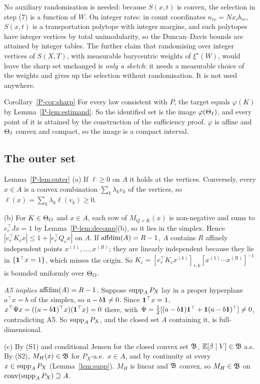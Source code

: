 No auxiliary randomisation is needed: because $S(x,t)$ is convex, the selection in
step (7) is a function of $W$. On integer rates: in count coordinates
$n_{rc}=Nx_rb_{rc}$, $S(x,t)$ is a transportation polytope with integer margins, and
such polytopes have integer vertices by total unimodularity, so the Duncan--Davis
bounds are attained by integer tables. The further claim that randomising over
integer vertices of $S(X,T)$, with measurable barycentric weights of $\xi^\star(W)$,
would leave the sharp set unchanged is \emph{only a sketch}: it needs a measurable
choice of the weights and gives up the selection without randomisation. It is not
used anywhere.

\begin{proofof}{Corollary~\ref{P-cor:sharp}}
For every law consistent with $P$, the target equals $\varphi(K)$ by
Lemma~\ref{P-lem:estimand}. So the identified set is the image $\varphi(\Theta_I)$, and
every point of it is attained by the construction of the sufficiency proof. $\varphi$
is affine and $\Theta_I$ convex and compact, so the image is a compact interval.
\end{proofof}

\subsection{The outer set}

\begin{proofof}{Lemma~\ref{P-lem:outer}}
(a) If $\ell\ge0$ on $A$ it holds at the vertices. Conversely, every $x\in A$ is a
convex combination $\sum_k\lambda_kv_k$ of the vertices, so $\ell(x)=\sum_k\lambda_k\ell(v_k)\ge0$.

(b) For $K\in\Theta_O$ and $x\in A$, each row of $M_{Q+K}(x)$ is non-negative and sums to
$e_r^\top Jx=1$ by Lemma~\ref{P-lem:decomp}(b), so it lies in the simplex. Hence
$|e_r^\top K_cx|\le1+|e_r^\top Q_cx|$ on $A$. If $\operatorname{affdim}(A)=R-1$, $A$ contains $R$
affinely independent points $x^{(1)},\dots,x^{(R)}$; they are linearly independent
because they lie in $\{\mathbf 1^\top x=1\}$, which misses the origin. So
$K_c=[e_r^\top K_cx^{(k)}]_{r,k}[x^{(1)}\cdots x^{(R)}]^{-1}$ is bounded uniformly over
$\Theta_O$.

\emph{A5 implies $\operatorname{affdim}(A)=R-1$.} Suppose $\operatorname{supp}_AP_X$ lay in a proper hyperplane
$a^\top x=b$ of the simplex, so $a-b\mathbf 1\ne0$. Since $\mathbf 1^\top x=1$,
$x^\top\Psi x=((a-b\mathbf 1)^\top x)(\mathbf 1^\top x)=0$ there, with
$\Psi=\tfrac12[(a-b\mathbf 1)\mathbf 1^\top+\mathbf 1(a-b\mathbf 1)^\top]\ne0$, contradicting A5. So
$\operatorname{supp}_AP_X$, and the closed set $A$ containing it, is full-dimensional.

(c) By (S1) and conditional Jensen for the closed convex set $\mathfrak B$,
$\mathbb E[\beta\mid V]\in\mathfrak B$ a.s. By (S2), $M_H(x)\in\mathfrak B$ for $P_X$-a.e.\ $x\in A$, and by
continuity at every $x\in\operatorname{supp}_AP_X$ (Lemma~\ref{lem:supp}). $M_H$ is linear and
$\mathfrak B$ convex, so $M_H\in\mathfrak B$ on $\operatorname{conv}(\operatorname{supp}_AP_X)\supseteq A$.
\end{proofof}

